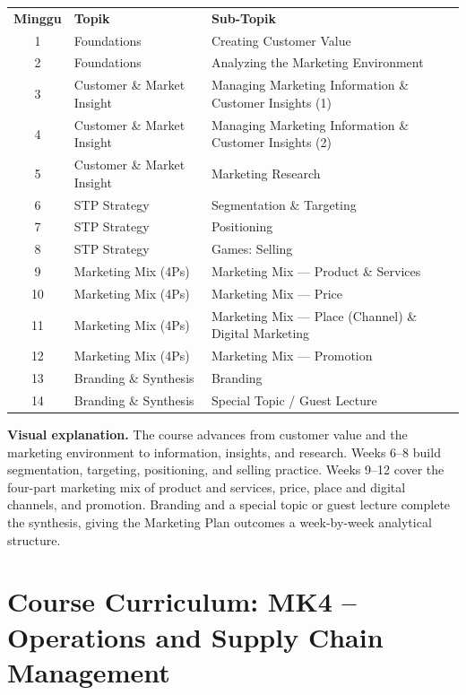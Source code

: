 \documentclass[10pt]{article}
\newcommand{\visualexplanation}[1]{%
  \begin{tcolorbox}[colback=lightgray,colframe=navy!35,boxrule=0.5pt,
    arc=2mm,left=2mm,right=2mm,top=1.5mm,bottom=1.5mm]
  \textbf{Visual explanation.} #1
  \end{tcolorbox}}
\begin{document}
\begin{center}\small
\begin{tabularx}{\textwidth}{c L{5.0cm} Y}
\color{white}\bfseries Minggu & \color{white}\bfseries Topik & \color{white}\bfseries Sub-Topik\\
1 & Foundations & Creating Customer Value\\
2 & Foundations & Analyzing the Marketing Environment\\
3 & Customer \& Market Insight & Managing Marketing Information \& Customer Insights (1)\\
4 & Customer \& Market Insight & Managing Marketing Information \& Customer Insights (2)\\
5 & Customer \& Market Insight & Marketing Research\\
6 & STP Strategy & Segmentation \& Targeting\\
7 & STP Strategy & Positioning\\
8 & STP Strategy & Games: Selling\\
9 & Marketing Mix (4Ps) & Marketing Mix --- Product \& Services\\
10 & Marketing Mix (4Ps) & Marketing Mix --- Price\\
11 & Marketing Mix (4Ps) & Marketing Mix --- Place (Channel) \& Digital Marketing\\
12 & Marketing Mix (4Ps) & Marketing Mix --- Promotion\\
13 & Branding \& Synthesis & Branding\\
14 & Branding \& Synthesis & Special Topic / Guest Lecture\\
\end{tabularx}
\end{center}

\visualexplanation{The course advances from customer value and the marketing environment to information, insights, and research. Weeks 6--8 build segmentation, targeting, positioning, and selling practice. Weeks 9--12 cover the four-part marketing mix of product and services, price, place and digital channels, and promotion. Branding and a special topic or guest lecture complete the synthesis, giving the Marketing Plan outcomes a week-by-week analytical structure.}

\section{Course Curriculum: MK4 -- Operations and Supply Chain Management}
\end{document}
